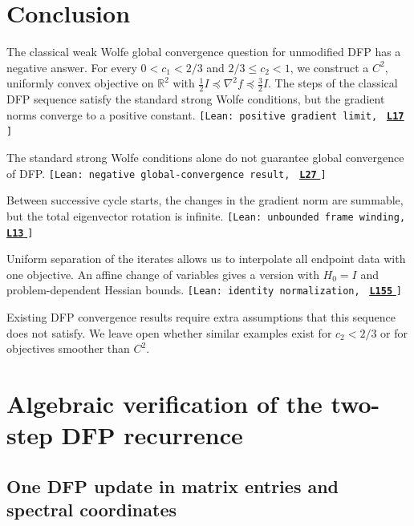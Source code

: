 \documentclass[11pt]{article}
\newcommand{\R}{\mathbb R}
\newcommand{\leanLinkText}[1]{%
  \underline{\textbf{#1}}%
}
\newcommand{\leanSnapshot}{e308927f5b7930bdd002f0c0e42b9d112ad821cb}
\newcommand{\leanClaimTag}[3]{%
  {\footnotesize\texttt{[Lean: #1, }}%
  \href{https://github.com/imathwy/DFP_wolfe_local/blob/\leanSnapshot/#2?plain=1\#L#3}%
    {\leanLinkText{\footnotesize\texttt{L#3}}}%
  {\footnotesize\texttt{]}}\enspace
}
\begin{document}
\FloatBarrier

\section{Conclusion}
\label{sec:conclusion}

The classical weak Wolfe global convergence question for unmodified DFP has a
negative answer.  For every $0<c_1<2/3$ and $2/3\le c_2<1$, we construct a
$C^2$, uniformly convex objective on $\R^2$ with
$\frac12I\preceq\nabla^2f\preceq\frac32I$.  The steps of the classical DFP
sequence satisfy the standard strong Wolfe conditions, but the gradient norms
converge to a positive constant.
\leanClaimTag{positive gradient limit}{DFPWolfe/A_uniformly_convex_counterexample_to_global_convergence_of_DFP_under_weak_Wolfe_/Theorem_Main_theorem.lean}{17}
The standard strong Wolfe conditions alone do not guarantee global convergence of DFP.
\leanClaimTag{negative global-convergence result}{DFPWolfe/A_uniformly_convex_counterexample_to_global_convergence_of_DFP_under_weak_Wolfe_/Theorem_Main_theorem.lean}{27}
Between successive
cycle starts, the changes in the gradient norm are summable, but the total
eigenvector rotation is infinite.
\leanClaimTag{unbounded frame winding}{DFPWolfe/A_uniformly_convex_counterexample_to_global_convergence_of_DFP_under_weak_Wolfe_/Lemma_4_8_Unbounded_frame_winding.lean}{13}
Uniform separation of the iterates allows
us to interpolate all endpoint data with one objective.  An affine change of
variables gives a version with $H_0=I$ and problem-dependent Hessian bounds.
\leanClaimTag{identity normalization}{DFPWolfe/A_uniformly_convex_counterexample_to_global_convergence_of_DFP_under_weak_Wolfe_/Theorem_Main_theorem.lean}{155}
Existing DFP convergence results require extra assumptions that this sequence
does not satisfy.  We leave open whether similar examples exist for $c_2<2/3$
or for objectives smoother than $C^2$.

\appendix

\section{Algebraic verification of the two-step DFP recurrence}
\label{app:algebra}

\subsection{One DFP update in matrix entries and spectral coordinates}
\end{document}
